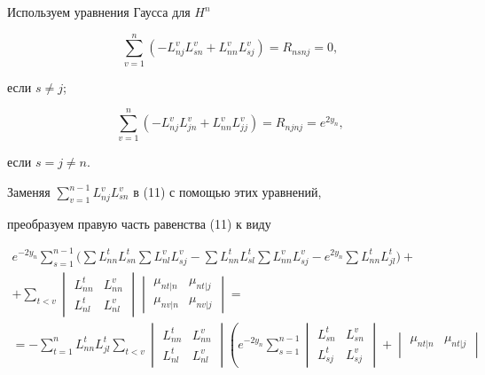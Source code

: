 \begin{pf}
Используем уравнения Гаусса для $H^n$


$$


\sum^n_{v=1}(-L^v_{nj}L^v_{sn}+L^v_{nn}L^v_{sj})=R_{nsnj}=0,


$$


если $s\ne j$;


$$


\sum^n_{v=1}(-L^v_{nj}L^v_{jn}+L^v_{nn}L^v_{jj})=R_{njnj}=e^{2y_n},


$$


если $s=j\ne n$.





Заменяя $\sum\limits^{n-1}_{v=1}L^v_{nj}L^v_{sn}$ в (11) с помощью этих уравнений, 


преобразуем правую часть равенства (11) к виду


\begin{multline}


e^{-2y_n}\sum^{n-1}_{s=1}\Big(\sum L^t_{nn}L^t_{sn}\sum


L^v_{nl}L^v_{sj}-\sum L^t_{nn}L^t_{sl}


\sum L^v_{nn}L^v_{sj}-e^{2y_n}\sum L^t_{nn}L^t_{jl}\Big)+\\


+\sum_{t<v}\begin{vmatrix} L^t_{nn} & L^v_{nn}\\


L^t_{nl} & L^v_{nl}\end{vmatrix}


\begin{vmatrix}\mu_{nt|n} & \mu_{nt|j}\\


\mu_{nv|n} & \mu_{nv|j}\end{vmatrix} = \\


=-\sum^n_{t=1}L^t_{nn}L^t_{jl}\sum_{t<v}


\begin{vmatrix} L^t_{nn} & L^v_{nn} \\L^t_{nl} & L^v_{nl}\end{vmatrix}


\left(e^{-2y_n}\sum^{n-1}_{s=1}\begin{vmatrix}


L^t_{sn} & L^v_{sn} \\ L^t_{sj} & L^v_{sj}\end{vmatrix}+


\begin{vmatrix}\mu_{nt|n} & \mu_{nt|j} \\



\end{vmatrix}
\end{multline}
\end{pf}
